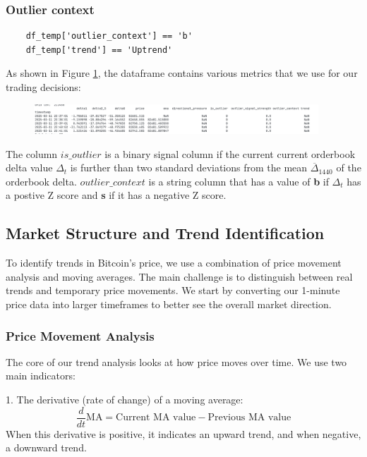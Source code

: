 \documentclass[12pt]{article}
\begin{document}
\subsubsection{Outlier context}


\begin{verbatim}
    df_temp['outlier_context'] == 'b'
    df_temp['trend'] == 'Uptrend'
\end{verbatim}

As shown in Figure \ref{fig:outlier_context}, the dataframe contains various metrics that we use for our trading decisions:

\begin{figure}[h]
    \centering
    \includegraphics[width=0.95\textwidth]{imgs/dataframeHead.png}
    \caption{}
    \label{fig:outlier_context}
\end{figure}


The column $is\_outlier$ is a binary signal column if the current current orderbook delta value $\Delta_t$ is further than two standard deviations from the mean $\overline{\Delta}_{1440}$ of the orderbook delta.
$outlier\_context$ is a string column that has a value of \textbf{b} if $\Delta_t$ has a postive Z score and \textbf{s} if it has a negative Z score.

\subsection{Market Structure and Trend Identification}

To identify trends in Bitcoin's price, we use a combination of price movement analysis and moving averages. The main challenge is to distinguish between real trends and temporary price movements. We start by converting our 1-minute price data into larger timeframes to better see the overall market direction.

\subsubsection{Price Movement Analysis}
The core of our trend analysis looks at how price moves over time. We use two main indicators:

1. The derivative (rate of change) of a moving average:
\begin{equation*}
    \frac{d}{dt}\text{MA} = \text{Current MA value} - \text{Previous MA value}
\end{equation*}
When this derivative is positive, it indicates an upward trend, and when negative, a downward trend.
\end{document}
